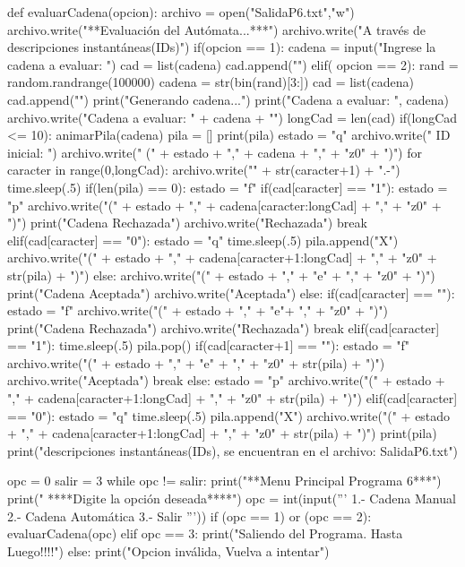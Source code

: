 \documentclass{article}
\begin{document}
\begin{python}
		def evaluarCadena(opcion):
			archivo = open("SalidaP6.txt","w")
			archivo.write("\n***Evaluación del Autómata...***\n")
			archivo.write("A través de descripciones instantáneas(IDs)")
			if(opcion == 1):
				cadena = input("Ingrese la cadena a evaluar: ")
				cad = list(cadena)
				cad.append("")
			elif( opcion == 2):
				rand = random.randrange(100000)
				cadena = str(bin(rand)[3:])
				cad = list(cadena)     
				cad.append("")   
				print("Generando cadena...")
			print("Cadena a evaluar: ", cadena)
			archivo.write("\n\n Cadena a evaluar: " + cadena + "\n")
			longCad = len(cad)
			if(longCad <= 10):
				animarPila(cadena)
			pila = []
			print(pila)    
			estado = "q"    
			archivo.write(" ID inicial: \n")  
			archivo.write("    (" + estado + "," + cadena + "," + "z0" + ")\n")   
			for caracter in range(0,longCad):    
				archivo.write("\n " + str(caracter+1) + ".-")       
				time.sleep(.5)   
				if(len(pila) == 0):
					estado = "f"                                  
					if(cad[caracter] == "1"):
						estado = "p"
						archivo.write("(" + estado + "," + cadena[caracter:longCad] + "," + "z0" + ")")   
						print("Cadena Rechazada")
						archivo.write("\nCadena Rechazada") 
						break                
					elif(cad[caracter] == "0"):
						estado = "q"
						time.sleep(.5)
						pila.append("X")
						archivo.write("(" + estado + "," + cadena[caracter+1:longCad] + "," + "z0" + str(pila) + ")")   
					else:
						archivo.write("(" + estado + "," + "e" + "," + "z0" + ")")   
						print("Cadena Aceptada")          
						archivo.write("\nCadena Aceptada")                
				else:
					if(cad[caracter] == ""):
						estado = "f"                                  
						archivo.write("(" + estado + "," + "e"+ "," + "z0" + ")")   
						print("Cadena Rechazada") 
						archivo.write("\nCadena Rechazada")    
						break
					elif(cad[caracter] == "1"):
						time.sleep(.5)
						pila.pop() 
						if(cad[caracter+1] == ""):
							estado = "f"
							archivo.write("(" + estado + "," + "e" + "," + "z0" + str(pila) + ")")    
							archivo.write("\nCadena Aceptada")             
							break
						else:
							estado = "p"                       
							archivo.write("(" + estado + "," + cadena[caracter+1:longCad] + "," + "z0" + str(pila) + ")")        
					elif(cad[caracter] == "0"):
						estado = "q"
						time.sleep(.5)
						pila.append("X")
						archivo.write("(" + estado + "," + cadena[caracter+1:longCad] + "," + "z0" + str(pila) + ")")             
				print(pila)
			print("\nLas descripciones instantáneas(IDs), se encuentran en el archivo: SalidaP6.txt")
		
		opc = 0
		salir = 3
		while opc != salir:
			print("\n\n***Menu Principal Programa 6***\n\n")
			print("   ****Digite la opción deseada****")
			opc = int(input('''
			1.- Cadena Manual
			2.- Cadena Automática
			3.- Salir
			'''))    
			if (opc == 1) or (opc == 2):
				evaluarCadena(opc)    
			elif opc == 3:
				print("Saliendo del Programa. Hasta Luego!!!!")
			else:
				print("Opcion inválida, Vuelva a intentar")

	\end{python}
	
\end{document}
